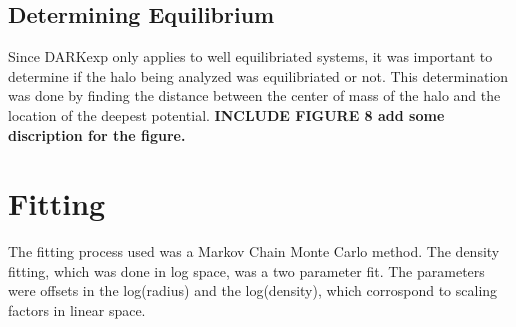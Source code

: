 \documentclass[12pt]{article}
\begin{document}
\subsection*{Determining Equilibrium}

Since DARKexp only applies to well equilibriated systems, it was important to determine if the halo being analyzed was equilibriated or not. This determination was done by finding the distance between the center of mass of the halo and the location of the deepest potential. \bf{INCLUDE FIGURE 8} add some discription for the figure.

\section*{Fitting}
The fitting process used was a Markov Chain Monte Carlo method. The density fitting, which was done in log space, was a two parameter fit. The parameters were offsets in the log(radius) and the log(density), which corrospond to scaling factors in linear space.
\end{document}
